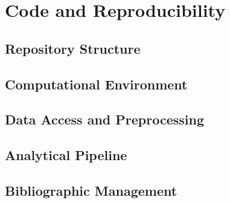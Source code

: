\chapter{Code and Reproducibility}
\label{app:code}

\section{Repository Structure}
\label{sec:app-repos}


\section{Computational Environment}
\label{sec:app-env}


\section{Data Access and Preprocessing}
\label{sec:app-data}


\section{Analytical Pipeline}
\label{sec:app-pipeline}


\section{Bibliographic Management}
\label{sec:app-biblio}


